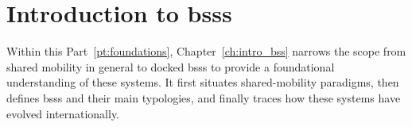 \chapter[Introduction to BSSs]{Introduction to \acp{bss}}
\label{ch:intro_bss}

Within this Part~\ref{pt:foundations}, Chapter~\ref{ch:intro_bss} narrows the scope from shared mobility in general to docked \acp{bss} to provide a foundational understanding of these systems. It first situates shared-mobility paradigms, then defines \acp{bss} and their main typologies, and finally traces how these systems have evolved internationally.





